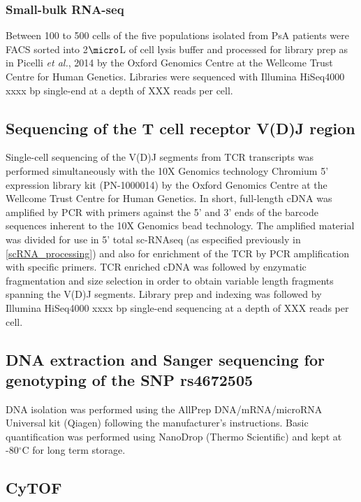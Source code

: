 \subsubsection{Small-bulk RNA-seq } 
Between 100 to 500 cells of the five populations isolated from PsA patients were FACS sorted into 2$\micro$L of cell lysis buffer and processed for library prep as in Picelli \textit{et al.}, 2014 by the Oxford Genomics Centre at the Wellcome Trust Centre for Human Genetics. Libraries were sequenced with Illumina HiSeq4000 xxxx bp single-end at a depth of XXX reads per cell.


\subsection{Sequencing of the T cell receptor V(D)J region}
Single-cell sequencing of the V(D)J segments from TCR transcripts was performed simultaneously with the 10X Genomics technology Chromium 5' expression library kit (PN-1000014) by the Oxford Genomics Centre at the Wellcome Trust Centre for Human Genetics. In short, full-length cDNA was amplified by PCR with primers against the 5’ and 3’ ends of the barcode sequences inherent to the 10X Genomics bead technology. The amplified material was divided for use in 5' total sc-RNAseq (as especified previously in \ref{scRNA_processing}) and also for enrichment of the TCR by PCR amplification with specific primers. TCR enriched cDNA was followed by enzymatic fragmentation and size selection in order to obtain variable length fragments spanning the V(D)J segments. Library prep and indexing was followed by Illumina HiSeq4000 xxxx bp single-end sequencing at a depth of XXX reads per cell.

\subsection{DNA extraction and Sanger sequencing for genotyping of the SNP rs4672505}
DNA isolation was performed using the AllPrep DNA/mRNA/microRNA Universal kit (Qiagen) following the manufacturer's instructions. Basic quantification was performed using NanoDrop (Thermo Scientific) and kept at -80{$^\circ$}C for long term storage.






\subsection{CyTOF}


